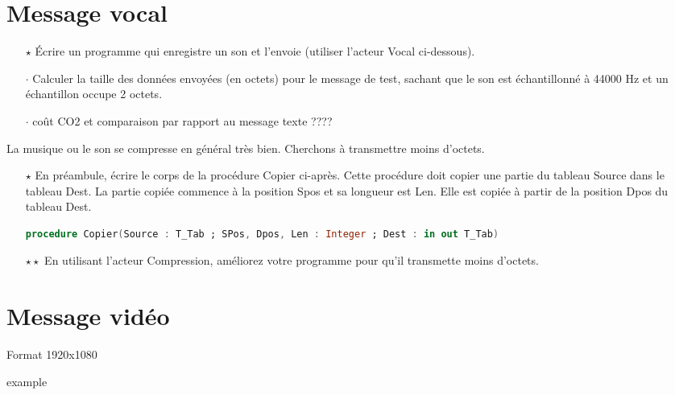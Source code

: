 \documentclass[a4paper]{article}
\begin{document}
\section{Message vocal}

\begin{itemize}
\item[$\star$] Écrire un programme qui enregistre un son et l'envoie (utiliser l'acteur Vocal ci-dessous).
\item[$\cdot$] Calculer la taille des données envoyées (en octets) pour le message de test, sachant que le son est échantillonné à 44000 Hz et un échantillon occupe 2 octets.
\item[$\cdot$] coût CO2 et comparaison par rapport au message texte ????
\end{itemize}

La musique ou le son se compresse en général très bien. Cherchons à transmettre moins d'octets.

\begin{itemize}
\item[$\star$] En préambule, écrire le corps de la procédure Copier ci-après. Cette procédure doit copier une partie du tableau Source dans le tableau Dest.
  La partie copiée commence à la position Spos et sa longueur est Len. Elle est copiée à partir de la position Dpos du tableau Dest.

  \begin{lstlisting}[language=Ada]
    procedure Copier(Source : T_Tab ; SPos, Dpos, Len : Integer ; Dest : in out T_Tab) 
  \end{lstlisting}
  
  \item[$\star\star$] En utilisant l'acteur Compression, améliorez votre programme pour qu'il transmette moins d'octets.
  \end{itemize}





\section{Message vidéo}



Format 1920x1080


 example
\end{document}
